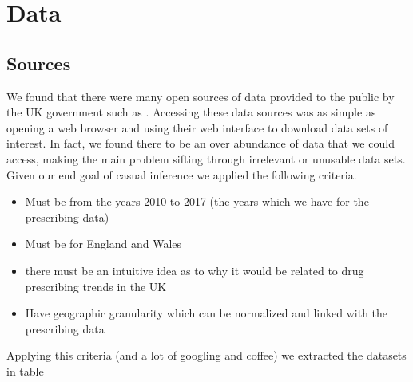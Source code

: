 \documentclass[a4paper]{article}
\begin{document}
\section{Data}
	\subsection{Sources}
		We found that there were many open sources of data provided to the public
		by the UK government such as %
		. Accessing these data sources was as simple as opening a web browser
		and using their web interface to download data sets of interest. In fact,
		we found there to be an over abundance of data that we could access, making 
		the main problem sifting through irrelevant or unusable data sets. Given our
		end goal of casual inference we applied the following criteria. 
		\begin{itemize}
			\item Must be from the years 2010 to 2017 (the years which we have for the prescribing data)
			\item Must be for England and Wales 
			\item there must be an intuitive idea as to why it would be related to drug prescribing trends in the UK
			\item Have geographic granularity which can be normalized and linked with the prescribing data
		\end{itemize}

		Applying this criteria (and a lot of googling and coffee) we extracted the datasets in table %
\end{document}
